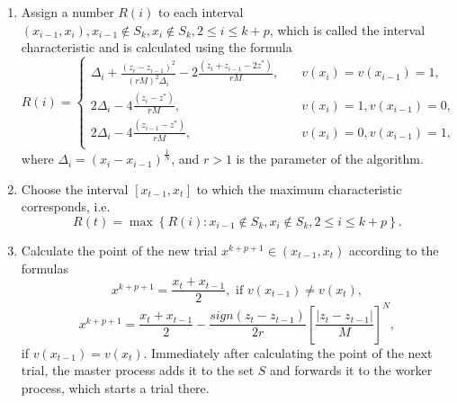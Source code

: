 \documentclass[runningheads]{llncs}
\begin{document}
\begin{enumerate}
\item Assign a number $R(i)$ to each interval $(x_{i-1}, x_i), x_{i-1} \notin S_k, x_i \notin S_k, 2 \leq i \leq k+p$, which is called the interval characteristic and is calculated using the formula
\begin{equation}\label{characteristic}
R(i)=
\begin{cases}
    \Delta_i+\frac{(z_i-z_{i-1})^2}{(rM)^2\Delta_i} - 2 \frac{(z_i+z_{i-1}-2z^*)}{rM},   & \quad v(x_i)=v(x_{i-1})=1,\\
    2\Delta_i- 4 \frac{(z_i-z^*)}{rM},   & \quad v(x_i)=1, v(x_{i-1})=0,\\
    2\Delta_i- 4 \frac{(z_{i-1}-z^*)}{rM},       & \quad v(x_i)=0, v(x_{i-1})=1,\\
\end{cases}
\end{equation}
where $\Delta_i=(x_i-x_{i-1})^\frac{1}{N}$, and $r>1$ is the parameter of the algorithm.

\item Choose the interval $[x_{t-1}, x_t]$ to which the maximum characteristic corresponds, i.e.
\[
R(t)= \max \left\{ R(i): x_{i-1} \notin S_k, x_i \notin S_k, 2 \leq i \leq k+p\right\}.
\]

\item Calculate the point of the new trial $x^{k+p+1} \in (x_{t-1}, x_t)$ according to the formulas
\begin{equation}\label{new_point_1} 
x^{k+p+1} = \frac{x_t+x_{t-1}}{2}, \text{ if } v(x_{t-1}) \neq v(x_t),
\end{equation}
\begin{equation}\label{new_point_2} 
x^{k+p+1} = \frac{x_t+x_{t-1}}{2}-\frac{\textit{sign}{(z_t-z_{t-1})}}{2r} \left[ \frac{|z_t-z_{t-1}|}{M} \right]^N,
\end{equation}
if $v(x_{t-1})=v(x_t)$.
Immediately after calculating the point of the next trial, the master process adds it to the set $S$ and forwards it to the worker process, which starts a trial there.
\end{enumerate}
\end{document}
